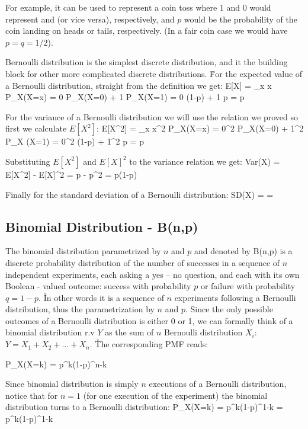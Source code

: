 \be
For example, it can be used to represent a coin toss where 1 and 0 would represent  and  (or
vice versa), respectively, and $p$ would be the probability of the coin landing on heads or tails, respectively. (In
a fair coin case we would have $p=q=1/2$).
\ee

Bernoulli distribution is the simplest discrete distribution, and it the building block for other more complicated
discrete distributions. \v

For the expected value of a Bernoulli distribution, straight from the definition we get:
\bse
E[X] = \sum _{x} x P_{X}(X=x) = 0 \cdot P_{X}(X=0) + 1 \cdot P_{X}(X=1) = 0 \cdot (1-p) + 1 \cdot p = p
\ese

For the variance of a Bernoulli distribution we will use the relation we proved so first we calculate $E[X^2]$:
\bse
E[X^2] = \sum _{x} x^2 P_{X}(X=x) = 0^2 \cdot P_{X}(X=0) + 1^2 \cdot P_{X} (X=1) = 0^2 \cdot (1-p) + 1^2 \cdot p = p
\ese

Substituting $E[X^2]$ and $E[X]^2$ to the variance relation we get:
\bse
Var(X) = E[X^{2}] - E[X]^{2} = p - p^2 = p(1-p)
\ese

Finally for the standard deviation of a Bernoulli distribution:
\bse
SD(X) =  = 
\ese

\subsection{Binomial Distribution - B(n,p)}

The binomial distribution parametrized by $n$ and $p$ and denoted by B(n,p) is a discrete probability distribution of
the number of successes in a sequence of $n$ independent experiments, each asking a yes – no question, and each with
its own Boolean - valued outcome: success with probability $p$ or failure with probability $q=1-p$. \v

In other words it is a sequence of $n$ experiments following a Bernoulli distribution, thus the parametrization by
$n$ and $p$. Since the only possible outcomes of a Bernoulli distribution is either 0 or 1, we can formally think of
a binomial distribution r.v $Y$ as the sum of $n$ Bernoulli distribution $X_{i}$: $Y=X_{1} + X_{2} + \ldots + X_{n}$. \v

The corresponding PMF reads:

\bse
P_{X}(X=k) = p^{k}(1-p)^{n-k}
\ese
\ed

Since binomial distribution is simply $n$ executions of a Bernoulli distribution, notice that for $n=1$ (for one
execution of the experiment) the binomial distribution turns to a Bernoulli distribution:
\bse
P_{X}(X=k) = p^{k}(1-p)^{1-k} = p^{k}(1-p)^{1-k}
\ese

